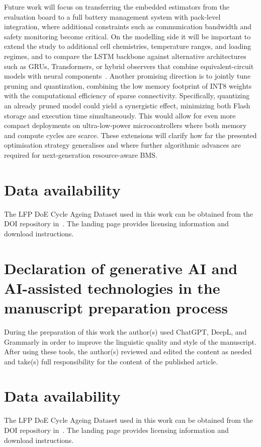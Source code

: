 \documentclass[review]{elsarticle}
\begin{document}
Future work will focus on transferring the embedded estimators from the evaluation board to a full battery management system with pack-level integration, where additional constraints such as communication bandwidth and safety monitoring become critical. On the modelling side it will be important to extend the study to additional cell chemistries, temperature ranges, and loading regimes, and to compare the LSTM backbone against alternative architectures such as GRUs, Transformers, or hybrid observers that combine equivalent-circuit models with neural components~\cite{liptonCriticalReviewRecurrent2015,singhDeepMachineLearning2024,gaoEnhancedStateofchargeEstimation2022,wangFusionEstimationLithiumion2022}. Another promising direction is to jointly tune pruning and quantization, combining the low memory footprint of INT8 weights with the computational efficiency of sparse connectivity. Specifically, quantizing an already pruned model could yield a synergistic effect, minimizing both Flash storage and execution time simultaneously. This would allow for even more compact deployments on ultra-low-power microcontrollers where both memory and compute cycles are scarce. These extensions will clarify how far the presented optimisation strategy generalises and where further algorithmic advances are required for next-generation resource-aware BMS.
\section*{Data availability}
The LFP DoE Cycle Ageing Dataset used in this work can be obtained from the DOI repository in~\cite{LFP_DoE_Cycle_Aging_Dataset}. The landing page provides licensing information and download instructions.

\section*{Declaration of generative AI and AI-assisted technologies in the manuscript preparation process}
During the preparation of this work the author(s) used ChatGPT, DeepL, and Grammarly in order to improve the linguistic quality and style of the manuscript. After using these tools, the author(s) reviewed and edited the content as needed and take(s) full responsibility for the content of the published article.

\section*{Data availability}
The LFP DoE Cycle Ageing Dataset used in this work can be obtained from the DOI repository in~\cite{LFP_DoE_Cycle_Aging_Dataset}. The landing page provides licensing information and download instructions.



\end{document}

